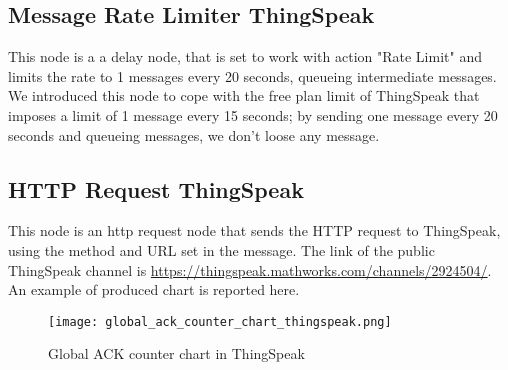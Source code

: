 \subsection{Message Rate Limiter ThingSpeak}
This node is a a delay node, that is set to work with action "Rate Limit" and limits the rate to 1 messages every 20 seconds, queueing intermediate messages. We introduced this node to cope with the free plan limit of ThingSpeak that imposes a limit of 1 message every 15 seconds; by sending one message every 20 seconds and queueing messages, we don't loose any message.

\subsection{HTTP Request ThingSpeak}
This node is an http request node that sends the HTTP request to ThingSpeak, using the method and URL set in the message. The link of the public ThingSpeak channel is \url{https://thingspeak.mathworks.com/channels/2924504/}.\\
An example of produced chart is reported here.
\begin{figure}[H]
    \centering
    \texttt{[image: global\_ack\_counter\_chart\_thingspeak.png]}
    \caption{Global ACK counter chart in ThingSpeak}
\end{figure}

